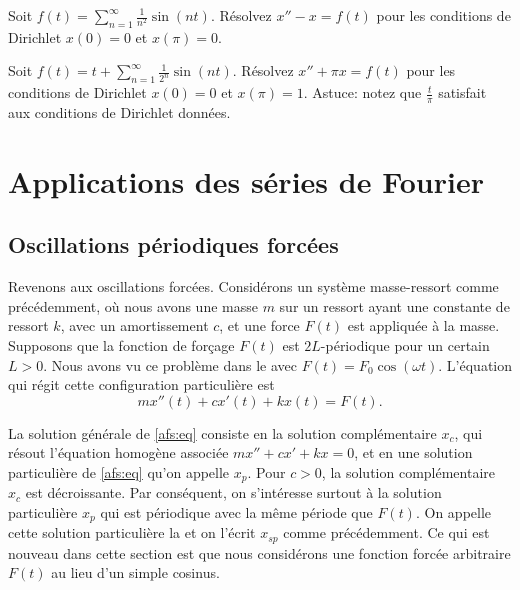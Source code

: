 \begin{exercise}
Soit $f(t) = \sum_{n=1}^\infty \frac{1}{n^2} \sin(nt)$.  Résolvez
$x''- x = f(t)$ pour les conditions de Dirichlet $x(0) = 0$
et $x(\pi) = 0$.
\end{exercise}

\begin{exercise}[défi]
Soit $f(t) = t + \sum_{n=1}^\infty \frac{1}{2^n} \sin(nt)$.  Résolvez
$x'' + \pi x = f(t)$ pour les conditions de Dirichlet $x(0) = 0$
et $x(\pi) = 1$.  Astuce:  notez que $\frac{t}{\pi}$ satisfait aux conditions de Dirichlet données.
\end{exercise}



\sectionnewpage
\section{Applications des séries de Fourier}
\label{appoffourier:section}


\subsection{Oscillations périodiques forcées}

\begin{mywrapfigsimp}{2.0in}{2.3in}
\noindent
{}
\end{mywrapfigsimp}
Revenons aux oscillations forcées. Considérons un système masse-ressort comme
précédemment, où nous avons une masse $m$ sur un ressort ayant une constante de ressort $k$, avec un amortissement $c$, et une force $F(t)$ est appliquée à la masse. 
Supposons que la fonction de forçage $ F (t) $ est $2L$-périodique pour un certain $L > 0$.
Nous avons vu ce problème dans le  avec $ F (t) = F_0 \cos (\omega t) $. L'équation qui régit cette configuration particulière est
\begin{equation} \label{afs:eq}
mx''(t) + cx'(t) + kx(t) = F(t) .
\end{equation}

La solution générale de \eqref{afs:eq} consiste en la solution complémentaire $ x_c $, qui résout l'équation homogène associée $mx'' + cx' + kx = 0$, et en une solution particulière de \eqref{afs:eq} qu'on appelle $x_p$. Pour $c > 0$,
la solution complémentaire $ x_c $ est décroissante.
Par conséquent, on s'intéresse surtout à la solution particulière $ x_p $ qui est périodique avec la même période que $ F (t) $. On appelle cette solution particulière la
\emph{} et on l'écrit  $ x_{sp} $ comme précédemment.
Ce qui est nouveau dans cette section est que nous considérons une fonction forcée arbitraire $ F (t) $ au lieu d'un simple cosinus.

